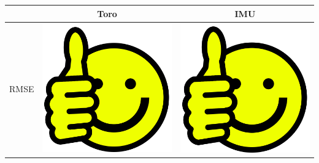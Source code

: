 \begin{table}
	\centering
	\begin{tabular}{|c|c|c|}\hline
	&Toro&IMU \\ \hline	
	RMSE &\includegraphics[scale=0.025]{Bilder/thumbs-up.png}&\includegraphics[scale=0.025]{Bilder/thumbs-up.png} \\ \hline

\end{tabular}
\end{table}
